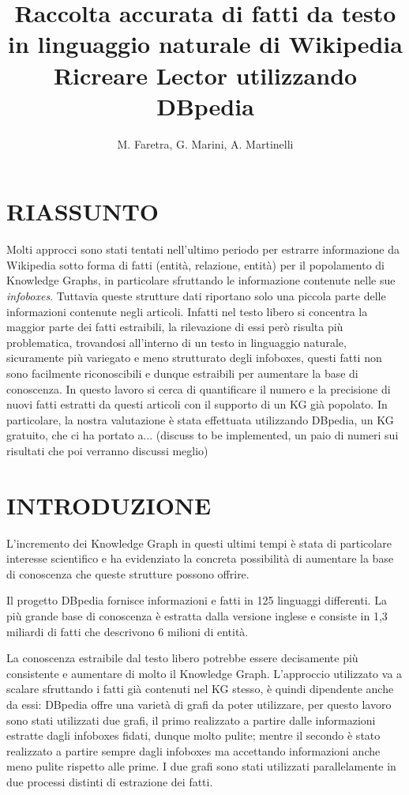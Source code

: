 \documentclass[10pt,a4paper,twocolumn]{article}
\author{M. Faretra, G. Marini, A. Martinelli}
\title{\textbf{Raccolta accurata di fatti da testo in linguaggio naturale di Wikipedia}\\Ricreare Lector utilizzando DBpedia}
\begin{document}
	
\maketitle
\pagestyle{empty}
		
\section*{RIASSUNTO}
		
Molti approcci sono stati tentati nell'ultimo periodo per estrarre informazione da Wikipedia sotto forma di fatti (entità, relazione, entità) per il popolamento di Knowledge Graphs, in particolare sfruttando le informazione contenute nelle sue \textit{infoboxes}. Tuttavia queste strutture dati riportano solo una piccola parte delle informazioni contenute negli articoli. Infatti nel testo libero si concentra la maggior parte dei fatti estraibili, la rilevazione di essi però risulta più problematica, trovandosi all'interno di un testo in linguaggio naturale, sicuramente più variegato e meno strutturato degli infoboxes, questi fatti non sono facilmente riconoscibili e dunque estraibili per aumentare la base di conoscenza. In questo lavoro si cerca di quantificare il numero e la precisione di nuovi fatti estratti da questi articoli con il supporto di un KG già popolato. In particolare, la nostra valutazione è stata effettuata utilizzando DBpedia, un KG gratuito, che ci ha portato a... (discuss to be implemented, un paio di numeri sui risultati che poi verranno discussi meglio)

\section{INTRODUZIONE} 

L'incremento dei Knowledge Graph in questi ultimi tempi è stata di particolare interesse scientifico e ha evidenziato la concreta possibilità di aumentare la base di conoscenza che queste strutture possono offrire.

Il progetto DBpedia fornisce informazioni e fatti in 125 linguaggi differenti. La più grande base di conoscenza è estratta dalla versione inglese e consiste in 1,3 miliardi di fatti che descrivono 6 milioni di entità. 


La conoscenza estraibile dal testo libero potrebbe essere decisamente più consistente e aumentare di molto il Knowledge Graph. L'approccio utilizzato va a scalare sfruttando i fatti già contenuti nel KG stesso, è quindi dipendente anche da essi: DBpedia offre una varietà di grafi da poter utilizzare, per questo lavoro sono stati utilizzati due grafi, il primo realizzato a partire dalle informazioni estratte dagli infoboxes fidati, dunque molto pulite; mentre il secondo è stato realizzato a partire sempre dagli infoboxes ma accettando informazioni anche meno pulite rispetto alle prime. I due grafi sono stati utilizzati parallelamente in due processi distinti di estrazione dei fatti.
\end{document}
